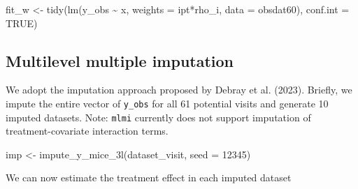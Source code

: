 \documentclass[
  letterpaper,
  DIV=11,
  numbers=noendperiod]{scrreprt}
\newenvironment{Shaded}{\begin{snugshade}}{\end{snugshade}}
\newcommand{\AttributeTok}[1]{\textcolor[rgb]{0.40,0.45,0.13}{#1}}
\newcommand{\ConstantTok}[1]{\textcolor[rgb]{0.56,0.35,0.01}{#1}}
\newcommand{\DecValTok}[1]{\textcolor[rgb]{0.68,0.00,0.00}{#1}}
\newcommand{\FunctionTok}[1]{\textcolor[rgb]{0.28,0.35,0.67}{#1}}
\newcommand{\NormalTok}[1]{\textcolor[rgb]{0.00,0.23,0.31}{#1}}
\newcommand{\OtherTok}[1]{\textcolor[rgb]{0.00,0.23,0.31}{#1}}
\newcommand{\SpecialCharTok}[1]{\textcolor[rgb]{0.37,0.37,0.37}{#1}}
\begin{document}
\begin{Shaded}
\begin{Highlighting}[]
\NormalTok{fit\_w }\OtherTok{\textless{}{-}} \FunctionTok{tidy}\NormalTok{(}\FunctionTok{lm}\NormalTok{(y\_obs }\SpecialCharTok{\textasciitilde{}}\NormalTok{ x, }\AttributeTok{weights =}\NormalTok{ ipt}\SpecialCharTok{*}\NormalTok{rho\_i, }\AttributeTok{data =}\NormalTok{ obsdat60), }\AttributeTok{conf.int =} \ConstantTok{TRUE}\NormalTok{)}
\end{Highlighting}
\end{Shaded}

\hypertarget{multilevel-multiple-imputation}{%
\subsection{Multilevel multiple
imputation}\label{multilevel-multiple-imputation}}

We adopt the imputation approach proposed by Debray et al. (2023).
Briefly, we impute the entire vector of \texttt{y\_obs} for all 61
potential visits and generate 10 imputed datasets. Note: \texttt{mlmi}
currently does not support imputation of treatment-covariate interaction
terms.

\begin{Shaded}
\begin{Highlighting}[]
\NormalTok{imp }\OtherTok{\textless{}{-}} \FunctionTok{impute\_y\_mice\_3l}\NormalTok{(dataset\_visit, }\AttributeTok{seed =} \DecValTok{12345}\NormalTok{)}
\end{Highlighting}
\end{Shaded}

We can now estimate the treatment effect in each imputed dataset
\end{document}
